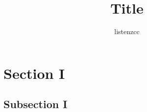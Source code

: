 \documentclass[a4paper]{article}
\title{Title}
\author{listenzcc}
\begin{document}
\maketitle

\abstract
[abstract]

\tableofcontents

\section{Section I}

\subsection{Subsection I}
\end{document}
